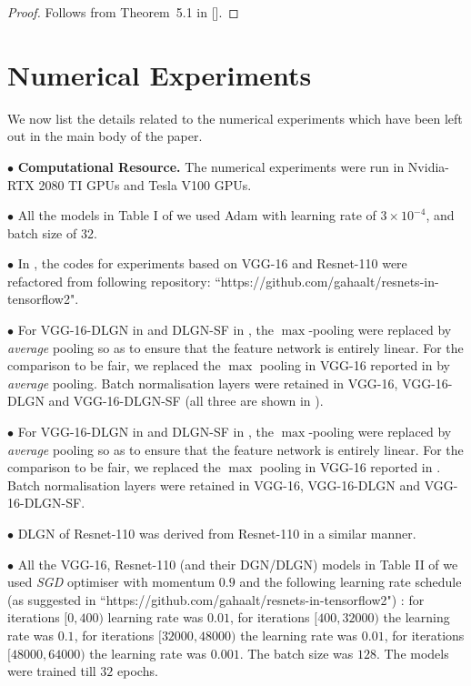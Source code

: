 \begin{proof}
Follows from Theorem~5.1 in [].
\end{proof}


\section{Numerical Experiments}\label{sec:expdetails}
We now list the details related to the numerical experiments which have been left out in the main body of the paper.

 $\bullet$ \textbf{Computational Resource.} The numerical experiments were run in Nvidia-RTX 2080 TI GPUs and Tesla V100 GPUs.

$\bullet$ All the models in Table I of  we used Adam \citep{adam} with learning rate of $3\times 10^{-4}$, and batch size of 32.

$\bullet$ In , the codes for experiments based on VGG-16 and Resnet-110  were refactored from following repository: ``https://github.com/gahaalt/resnets-in-tensorflow2".

$\bullet$ For VGG-16-DLGN in  and DLGN-SF in , the $\max$-pooling were replaced by \emph{average} pooling so as to ensure that the feature network is entirely linear. For the comparison to be fair, we replaced the $\max$ pooling in VGG-16 reported in  by \emph{average} pooling. Batch normalisation layers were retained in VGG-16, VGG-16-DLGN and VGG-16-DLGN-SF (all three are shown in ).


$\bullet$ For VGG-16-DLGN in  and DLGN-SF in , the $\max$-pooling were replaced by \emph{average} pooling so as to ensure that the feature network is entirely linear. For the comparison to be fair, we replaced the $\max$ pooling in VGG-16 reported in . Batch normalisation layers were retained in VGG-16, VGG-16-DLGN and VGG-16-DLGN-SF.

$\bullet$ DLGN of Resnet-110 was derived from Resnet-110 in a similar manner.

$\bullet$ All the VGG-16, Resnet-110 (and their DGN/DLGN) models in Table II of  we used \emph{SGD} optimiser with momentum $0.9$ and the following learning rate schedule (as suggested in ``https://github.com/gahaalt/resnets-in-tensorflow2") : for iterations $[0, 400)$ learning rate was $0.01$,  for iterations $[400, 32000)$ the learning rate was $ 0.1$, for iterations $[32000, 48000)$ the learning rate was $0.01$, for iterations $[48000, 64000)$ the learning rate was $0.001$. The batch size was $128$. The models were trained till $32$ epochs.


